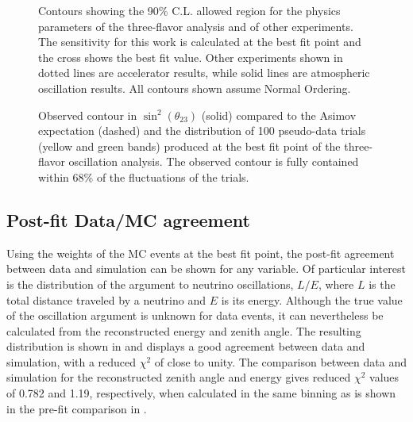 \begin{figure}
    \centering
  
  \caption{Contours showing the 90\% C.L. allowed region for the physics parameters of the three-flavor analysis and of other experiments\cite{SK2020,t2k_neutrino_2020,MINOS:2020llm,NOvA:2021nfi}. The sensitivity for this work is calculated at the best fit point and the cross shows the best fit value. Other experiments shown in dotted lines are accelerator results, while solid lines are atmospheric oscillation results. All contours shown assume Normal Ordering.
  \label{fig:real_data_contour_three_flavor}}
\end{figure}

\begin{figure}
    \centering
    
    \caption{Observed contour in $\sin^2(\theta_{23})$ (solid) compared to the Asimov expectation (dashed) and the distribution of 100 pseudo-data trials (yellow and green bands) produced at the best fit point of the three-flavor oscillation analysis. The observed contour is fully contained within 68\% of the fluctuations of the trials.
  \label{fig:mixing_brazil_band_three_flavor}}
\end{figure}

\subsection{Post-fit Data/MC agreement}

Using the weights of the MC events at the best fit point, the post-fit agreement between data and simulation can be shown for any variable. Of particular interest is the distribution of the argument to neutrino oscillations, $L/E$, where $L$ is the total distance traveled by a neutrino and $E$ is its energy. Although the true value of the oscillation argument is unknown for data events, it can nevertheless be calculated from the reconstructed energy and zenith angle. The resulting distribution is shown in  and displays a good agreement between data and simulation, with a reduced $\chi^2$ of close to unity. The comparison between data and simulation for the reconstructed zenith angle and energy gives reduced $\chi^2$ values of 0.782 and 1.19, respectively, when calculated in the same binning as is shown in the pre-fit comparison in .


